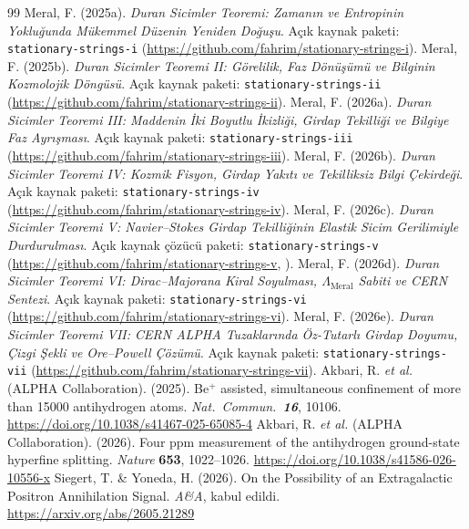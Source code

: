 \documentclass[12pt,a4paper]{article}
\begin{document}
\begin{thebibliography}{99}
     Meral, F. (2025a). \textit{Duran Sicimler Teoremi: Zamanın ve Entropinin Yokluğunda Mükemmel Düzenin Yeniden Doğuşu}. Açık kaynak paketi: \texttt{stationary-strings-i} (\url{https://github.com/fahrim/stationary-strings-i}).
     Meral, F. (2025b). \textit{Duran Sicimler Teoremi II: Görelilik, Faz Dönüşümü ve Bilginin Kozmolojik Döngüsü}. Açık kaynak paketi: \texttt{stationary-strings-ii} (\url{https://github.com/fahrim/stationary-strings-ii}).
     Meral, F. (2026a). \textit{Duran Sicimler Teoremi III: Maddenin İki Boyutlu İkizliği, Girdap Tekilliği ve Bilgiye Faz Ayrışması}. Açık kaynak paketi: \texttt{stationary-strings-iii} (\url{https://github.com/fahrim/stationary-strings-iii}).
     Meral, F. (2026b). \textit{Duran Sicimler Teoremi IV: Kozmik Fisyon, Girdap Yakıtı ve Tekilliksiz Bilgi Çekirdeği}. Açık kaynak paketi: \texttt{stationary-strings-iv} (\url{https://github.com/fahrim/stationary-strings-iv}).
     Meral, F. (2026c). \textit{Duran Sicimler Teoremi V: Navier--Stokes Girdap Tekilliğinin Elastik Sicim Gerilimiyle Durdurulması}. Açık kaynak çözücü paketi: \texttt{stationary-strings-v} (\url{https://github.com/fahrim/stationary-strings-v}, ).
     Meral, F. (2026d). \textit{Duran Sicimler Teoremi VI: Dirac--Majorana Kiral Soyulması, $\Lambda_{\mathrm{Meral}}$ Sabiti ve CERN Sentezi}. Açık kaynak paketi: \texttt{stationary-strings-vi} (\url{https://github.com/fahrim/stationary-strings-vi}).
     Meral, F. (2026e). \textit{Duran Sicimler Teoremi VII: CERN ALPHA Tuzaklarında Öz-Tutarlı Girdap Doyumu, Çizgi Şekli ve Ore--Powell Çözümü}. Açık kaynak paketi: \texttt{stationary-strings-vii} (\url{https://github.com/fahrim/stationary-strings-vii}).
     Akbari, R. \textit{et al.} (ALPHA Collaboration). (2025). Be$^+$ assisted, simultaneous confinement of more than 15000 antihydrogen atoms. \textit{Nat.\ Commun.\ \textbf{16}}, 10106. \url{https://doi.org/10.1038/s41467-025-65085-4}
     Akbari, R. \textit{et al.} (ALPHA Collaboration). (2026). Four ppm measurement of the antihydrogen ground-state hyperfine splitting. \textit{Nature} \textbf{653}, 1022--1026. \url{https://doi.org/10.1038/s41586-026-10556-x}
     Siegert, T. \& Yoneda, H. (2026). On the Possibility of an Extragalactic Positron Annihilation Signal. \textit{A\&A}, kabul edildi. \url{https://arxiv.org/abs/2605.21289}

\end{thebibliography}
\end{document}
